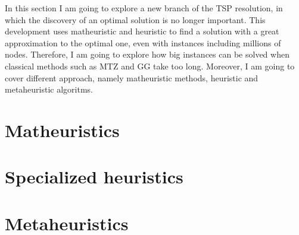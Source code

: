 In this section I am going to explore a new branch of the TSP resolution, in which the discovery of an optimal solution is no longer important. This development uses  matheuristic and heuristic to find a solution with a great approximation to the optimal one, even with instances including millions of nodes. Therefore, I am going to explore how big instances can be solved when classical methods such as MTZ and GG take too long. Moreover, I am going to cover different approach, namely matheuristic methods, heuristic and metaheuristic algoritms.


\section{Matheuristics}


\section{Specialized heuristics}


\section{Metaheuristics}
\label{chapter:metaheuristics}
